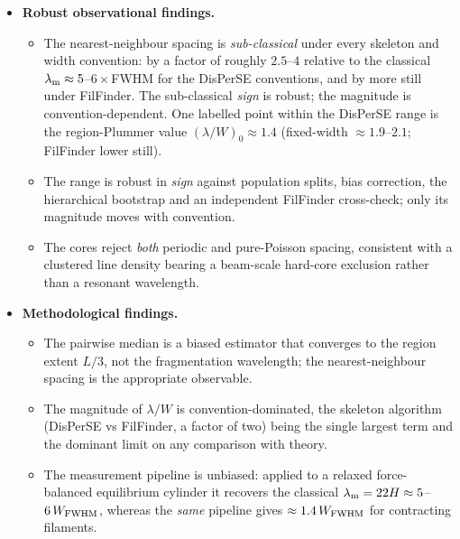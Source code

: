 \documentclass[usenatbib,twoside,twocolumn]{mnras}
\begin{document}
\begin{itemize}
    \item \textbf{Robust observational findings.}
    \begin{itemize}
        \item The nearest-neighbour spacing is \emph{sub-classical} under every skeleton and width convention: by a factor of roughly $2.5$--$4$ relative to the classical $\lambda_{\rm m}\approx5$--$6\times$FWHM for the DisPerSE conventions, and by more still under FilFinder. The sub-classical \emph{sign} is robust; the magnitude is convention-dependent. One labelled point within the DisPerSE range is the region-Plummer value $(\lambda/W)_0\approx1.4$ (fixed-width $\approx1.9$--$2.1$; FilFinder lower still).
        \item The range is robust in \emph{sign} against population splits, bias correction, the hierarchical bootstrap and an independent FilFinder cross-check; only its magnitude moves with convention.
        \item The cores reject \emph{both} periodic and pure-Poisson spacing, consistent with a clustered line density bearing a beam-scale hard-core exclusion rather than a resonant wavelength.
    \end{itemize}

    \item \textbf{Methodological findings.}
    \begin{itemize}
        \item The pairwise median is a biased estimator that converges to the region extent $L/3$, not the fragmentation wavelength; the nearest-neighbour spacing is the appropriate observable.
        \item The magnitude of $\lambda/W$ is convention-dominated, the skeleton algorithm (DisPerSE vs FilFinder, a factor of two) being the single largest term and the dominant limit on any comparison with theory.
        \item The measurement pipeline is unbiased: applied to a relaxed force-balanced equilibrium cylinder it recovers the classical $\lambda_{\rm m}=22H\approx5$--$6\,W_{\rm FWHM}$, whereas the \emph{same} pipeline gives $\approx1.4\,W_{\rm FWHM}$ for contracting filaments.
    \end{itemize}


\end{itemize}
\end{document}
